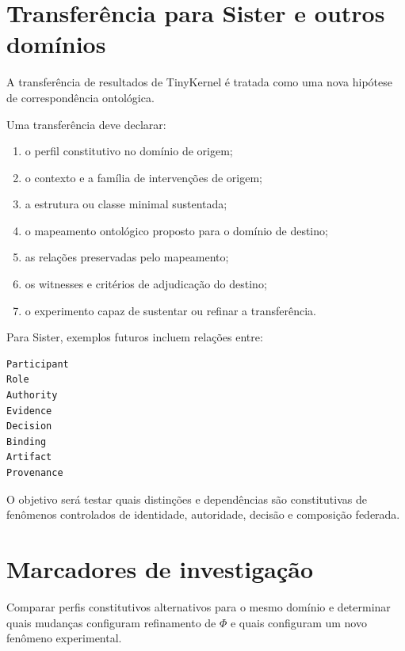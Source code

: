 \documentclass[11pt,a4paper]{article}
\begin{document}
\section{Transferência para Sister e outros domínios}

A transferência de resultados de TinyKernel é tratada como uma nova hipótese de
correspondência ontológica.

Uma transferência deve declarar:

\begin{enumerate}
  \item o perfil constitutivo no domínio de origem;
  \item o contexto e a família de intervenções de origem;
  \item a estrutura ou classe minimal sustentada;
  \item o mapeamento ontológico proposto para o domínio de destino;
  \item as relações preservadas pelo mapeamento;
  \item os witnesses e critérios de adjudicação do destino;
  \item o experimento capaz de sustentar ou refinar a transferência.
\end{enumerate}

Para Sister, exemplos futuros incluem relações entre:

\begin{lstlisting}
Participant
Role
Authority
Evidence
Decision
Binding
Artifact
Provenance
\end{lstlisting}

O objetivo será testar quais distinções e dependências são constitutivas de fenômenos
controlados de identidade, autoridade, decisão e composição federada.

\section{Marcadores de investigação}

\begin{markerbox}
Comparar perfis constitutivos alternativos para o mesmo domínio e determinar quais
mudanças configuram refinamento de $\Phi$ e quais configuram um novo fenômeno
experimental.
\end{markerbox}
\end{document}
